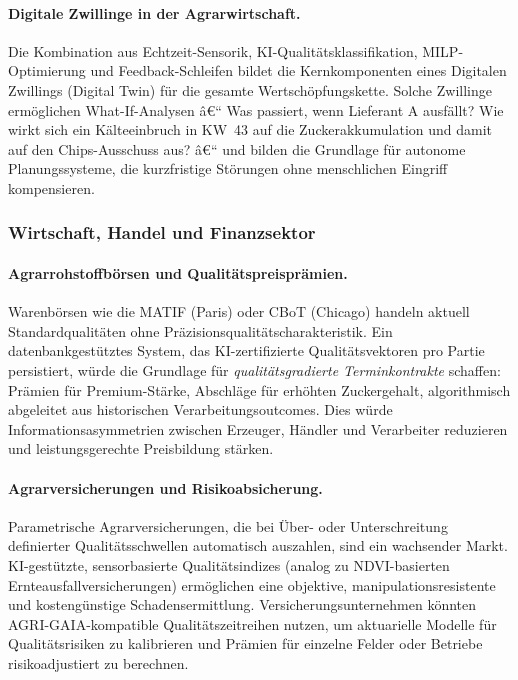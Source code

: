 ﻿\documentclass[12pt,a4paper]{article}
\theoremstyle{plain}
\theoremstyle{definition}
\begin{document}
	\paragraph{Digitale Zwillinge in der Agrarwirtschaft.}
	Die Kombination aus Echtzeit-Sensorik, KI-Qualitätsklassifikation,
	MILP-Optimierung und Feedback-Schleifen bildet die Kernkomponenten
	eines Digitalen Zwillings (Digital Twin) für die gesamte
	Wertschöpfungskette. Solche Zwillinge ermöglichen What-If-Analysen â€“
	Was passiert, wenn Lieferant A ausfällt? Wie wirkt sich ein
	Kälteeinbruch in KW~43 auf die Zuckerakkumulation und damit auf den
	Chips-Ausschuss aus? â€“ und bilden die Grundlage für autonome
	Planungssysteme, die kurzfristige Störungen ohne menschlichen
	Eingriff kompensieren.

	\subsubsection{Wirtschaft, Handel und Finanzsektor}

	\paragraph{Agrarrohstoffbörsen und Qualitätspreisprämien.}
	Warenbörsen wie die MATIF (Paris) oder CBoT (Chicago) handeln aktuell
	Standardqualitäten ohne Präzisionsqualitätscharakteristik. Ein
	datenbankgestütztes System, das KI-zertifizierte Qualitätsvektoren
	pro Partie persistiert, würde die Grundlage für \emph{qualitätsgradierte
	Terminkontrakte} schaffen: Prämien für Premium-Stärke, Abschläge für
	erhöhten Zuckergehalt, algorithmisch abgeleitet aus historischen
	Verarbeitungsoutcomes. Dies würde Informationsasymmetrien zwischen
	Erzeuger, Händler und Verarbeiter reduzieren und leistungsgerechte
	Preisbildung stärken.

	\paragraph{Agrarversicherungen und Risikoabsicherung.}
	Parametrische Agrarversicherungen, die bei Über- oder Unterschreitung
	definierter Qualitätsschwellen automatisch auszahlen, sind ein
	wachsender Markt. KI-gestützte, sensorbasierte Qualitätsindizes
	(analog zu NDVI-basierten Ernteausfallversicherungen) ermöglichen
	eine objektive, manipulationsresistente und kostengünstige
	Schadensermittlung. Versicherungsunternehmen könnten
	AGRI-GAIA-kompatible Qualitätszeitreihen nutzen, um aktuarielle
	Modelle für Qualitätsrisiken zu kalibrieren und Prämien
	für einzelne Felder oder Betriebe risikoadjustiert zu berechnen.
\end{document}

